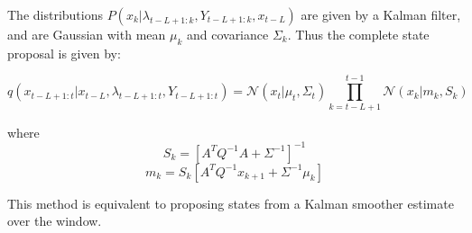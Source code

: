 The distributions $P(x_k|\lambda_{t-L+1:k}, Y_{t-L+1:k}, x_{t-L})$ are given by a Kalman filter, and are Gaussian with mean $\mu_k$ and covariance $\Sigma_k$. Thus the complete state proposal is given by:

\begin{equation}
q(x_{t-L+1:t}|x_{t-L}, \lambda_{t-L+1:t}, Y_{t-L+1:t}) = \mathcal{N}(x_t|\mu_t, \Sigma_t) \prod_{k=t-L+1}^{t-1} \mathcal{N}(x_k|m_k, S_k)
\label{eq:}
\end{equation}

where
\begin{equation}S_k = [ A^T Q^{-1} A + \Sigma^{-1} ]^{-1}\label{eq:}\end{equation}
\begin{equation}m_k = S_k [ A^T Q^{-1} x_{k+1} + \Sigma^{-1} \mu_k ]\label{eq:}\end{equation}

This method is equivalent to proposing states from a Kalman smoother estimate over the window.